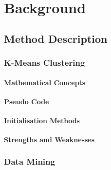 \chapter{Background}
\label{cha:background}

\section{Method Description}
\label{sec:method_description}



\subsection{K-Means Clustering}
\subsubsection*{Mathematical Concepts}
\subsubsection*{Pseudo Code}
\subsubsection*{Initialisation Methods}
\subsubsection*{Strengths and Weaknesses}

\subsection{Data Mining}